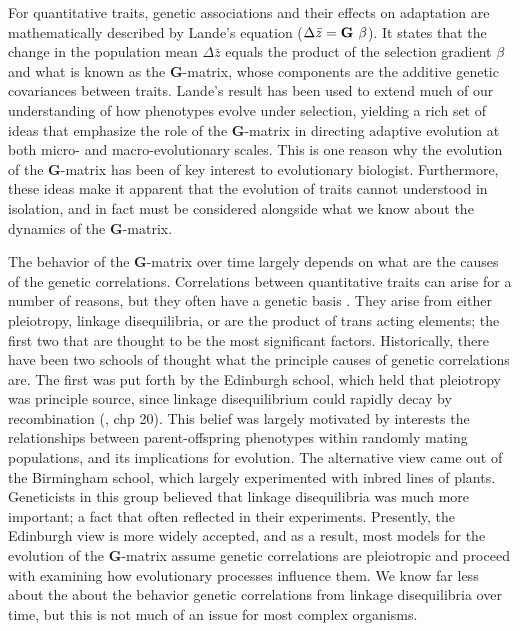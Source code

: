 \documentclass[9pt,twocolumn,twoside]{gsajnl}
\begin{document}
For quantitative traits, genetic associations and their effects on adaptation are mathematically described by Lande's equation ($\Delta \bar{z} = \textbf{G} \hspace{.05in}\beta$). It states that the change in the population mean $\Delta \bar{z}$ equals the product of the selection gradient $\beta$ and what is known as the \textbf{G}-matrix, whose components are the additive genetic covariances between traits. Lande’s result has been used to extend much of our understanding of how phenotypes evolve under selection, yielding a rich set of ideas that emphasize the role of the \textbf{G}-matrix in directing adaptive evolution at both micro- and macro-evolutionary scales. This is one reason why the evolution of the \textbf{G}-matrix has been of key interest to evolutionary biologist. Furthermore, these ideas make it apparent that the evolution of traits cannot understood in isolation, and in fact must be considered alongside what we know about the dynamics of the \textbf{G}-matrix.\par
% 
% 

The behavior of the \textbf{G}-matrix over time largely depends on what are the causes of the genetic correlations. Correlations between quantitative traits can arise for a number of reasons, but they often have a genetic basis \citep{Saltz2017}. They arise from either pleiotropy, linkage disequilibria, or are the product of trans acting elements; the first two that are thought to be the most significant factors. Historically, there have been two schools of thought what the principle causes of genetic correlations are. The first was put forth by the Edinburgh school, which held that pleiotropy was principle source, since linkage disequilibrium could rapidly decay by recombination (\citep{fox2006evolutionary}, chp 20). This belief was largely motivated by interests the relationships between parent-offspring phenotypes within randomly mating populations, and its implications for evolution. The alternative view came out of the Birmingham school, which largely experimented with inbred lines of plants. Geneticists in this group believed that linkage disequilibria was much more important; a fact that often reflected in their experiments. Presently, the Edinburgh view is more widely accepted, and as a result, most models for the evolution of the \textbf{G}-matrix assume genetic correlations are pleiotropic and proceed with examining how evolutionary processes influence them. We know far less about the about the behavior genetic correlations from linkage disequilibria over time, but this is not much of an issue for most complex organisms.\par
\end{document}
